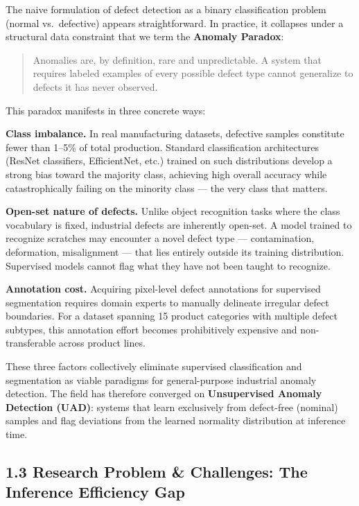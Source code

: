 \documentclass[12pt, a4paper, oneside]{report}
\begin{document}
The naive formulation of defect detection as a binary classification problem (normal vs.~defective) appears straightforward. In practice, it collapses under a structural data constraint that we term the \textbf{Anomaly Paradox}:

\begin{quote}
Anomalies are, by definition, rare and unpredictable. A system that requires labeled examples of every possible defect type cannot generalize to defects it has never observed.
\end{quote}

This paradox manifests in three concrete ways:

\textbf{Class imbalance.} In real manufacturing datasets, defective samples constitute fewer than 1--5\% of total production. Standard classification architectures (ResNet classifiers, EfficientNet, etc.) trained on such distributions develop a strong bias toward the majority class, achieving high overall accuracy while catastrophically failing on the minority class --- the very class that matters.

\textbf{Open-set nature of defects.} Unlike object recognition tasks where the class vocabulary is fixed, industrial defects are inherently open-set. A model trained to recognize scratches may encounter a novel defect type --- contamination, deformation, misalignment --- that lies entirely outside its training distribution. Supervised models cannot flag what they have not been taught to recognize.

\textbf{Annotation cost.} Acquiring pixel-level defect annotations for supervised segmentation requires domain experts to manually delineate irregular defect boundaries. For a dataset spanning 15 product categories with multiple defect subtypes, this annotation effort becomes prohibitively expensive and non-transferable across product lines.

These three factors collectively eliminate supervised classification and segmentation as viable paradigms for general-purpose industrial anomaly detection. The field has therefore converged on \textbf{Unsupervised Anomaly Detection (UAD)}: systems that learn exclusively from defect-free (nominal) samples and flag deviations from the learned normality distribution at inference time.

\subsection{1.3 Research Problem \& Challenges: The Inference Efficiency Gap}\label{research-problem-challenges-the-inference-efficiency-gap}
\end{document}
